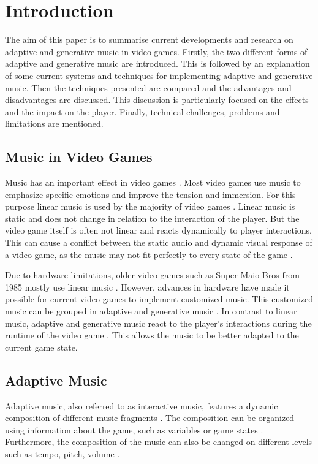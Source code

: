 \section{Introduction}
The aim of this paper is to summarise current developments and research on adaptive and generative music in video games. Firstly, the two different forms of adaptive and generative music are introduced. This is followed by an explanation of some current systems and techniques for implementing adaptive and generative music. Then the techniques presented are compared and the advantages and disadvantages are discussed. This discussion is particularly focused on the effects and the impact on the player. Finally, technical challenges, problems and limitations are mentioned. 

\subsection{Music in Video Games}
Music has an important effect in video games \cite{fu2015backgroundmusic}. Most video games use music to emphasize specific emotions and improve the tension and immersion. For this purpose linear music is used by the majority of video games \cite{prechtl2016adaptive}. Linear music is static and does not change in relation to the interaction of the player. But the video game itself is often not linear and reacts dynamically to player interactions. This can cause a conflict between the static audio and dynamic visual response of a video game, as the music may not fit perfectly to every state of the game \cite{plut2022preglam}.

Due to hardware limitations, older video games such as Super Maio Bros from 1985 \cite{supermariobros1985} mostly use linear music \cite{plut2020generative}. However, advances in hardware have made it possible for current video games to implement customized music. This customized music can be grouped in adaptive and generative music \cite{plut2020generative}. In contrast to linear music, adaptive and generative music react to the player's interactions during the runtime of the video game \cite{plut2020generative}. This allows the music to be better adapted to the current game state.

\subsection{Adaptive Music}
Adaptive music, also referred to as interactive music, features a dynamic composition of different music fragments \cite{plut2020generative} \cite{hutMcCormAms} \cite{amaral2022adaptive}.
The composition can be organized using information about the game, such as variables or game states \cite{plut2020generative}. 
Furthermore, the composition of the music can also be changed on different levels such as tempo, pitch, volume \cite{plut2020generative} \cite{amaral2022adaptive}.

